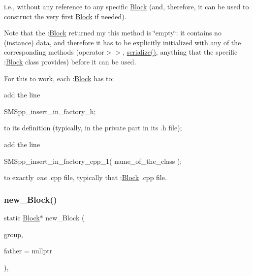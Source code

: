 i.\+e., without any reference to any specific \mbox{\hyperlink{class_s_m_spp__di__unipi__it_1_1_block}{Block}} (and, therefore, it can be used to construct the very first \mbox{\hyperlink{class_s_m_spp__di__unipi__it_1_1_block}{Block}} if needed).

Note that the \+:\mbox{\hyperlink{class_s_m_spp__di__unipi__it_1_1_block}{Block}} returned my this method is \char`\"{}empty\char`\"{}\+: it contains no (instance) data, and therefore it has to be explicitly initialized with any of the corresponding methods (operator$>$$>$, \mbox{\hyperlink{class_s_m_spp__di__unipi__it_1_1_block_a8209df4072912666c1ea5f6979c035fc}{serialize()}}, anything that the specific \+:\mbox{\hyperlink{class_s_m_spp__di__unipi__it_1_1_block}{Block}} class provides) before it can be used.

For this to work, each \+:\mbox{\hyperlink{class_s_m_spp__di__unipi__it_1_1_block}{Block}} has to\+:


\begin{DoxyItemize}
\item add the line \begin{DoxyVerb}SMSpp_insert_in_factory_h;
\end{DoxyVerb}


to its definition (typically, in the private part in its .h file);
\item add the line \begin{DoxyVerb}SMSpp_insert_in_factory_cpp_1( name_of_the_class );
\end{DoxyVerb}


to exactly {\itshape one} .cpp file, typically that \+:\mbox{\hyperlink{class_s_m_spp__di__unipi__it_1_1_block}{Block}} .cpp file. 
\end{DoxyItemize}\mbox{\label{class_s_m_spp__di__unipi__it_1_1_block_a47c09b44e75478c5f3e24323d2f6449f}} 
\subsubsection{\texorpdfstring{new\+\_\+\+Block()}{new\_Block()}\hspace{0.1cm}{\footnotesize\ttfamily [2/2]}}
{\footnotesize\ttfamily static \mbox{\hyperlink{class_s_m_spp__di__unipi__it_1_1_block}{Block}}$\ast$ new\+\_\+\+Block (\begin{DoxyParamCaption}\item[{net\+C\+D\+F\+::\+Nc\+Group \&\&}]{group,  }\item[{\mbox{\hyperlink{class_s_m_spp__di__unipi__it_1_1_block}{Block}} $\ast$const}]{father = {\ttfamily nullptr} }\end{DoxyParamCaption})\hspace{0.3cm}{\ttfamily [inline]}, {\ttfamily [static]}}



